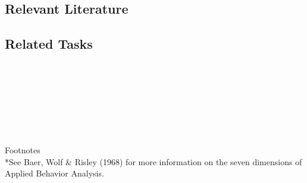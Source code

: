 \subsection{Relevant Literature}
\begin{refsection}
\nocite{baer1968some,
        cooper2007applied,
        gresham1993treatment,
        johnston2010strategies,
        peterson1982integrity}
\printbibliography[heading=none]
\end{refsection}
%
\subsection{Related Tasks}
\fourbEleven{}\\
\fouriOne{}\\
\fouriFour{}\\
\fourjOne{}\\
\fourFKSeven{}\\
\fourFKEleven{}\\
\fourFKThirtyThree{}\\
%
Footnotes\\
*See Baer, Wolf \& Risley (1968) for more information on the seven dimensions of Applied Behavior Analysis.
